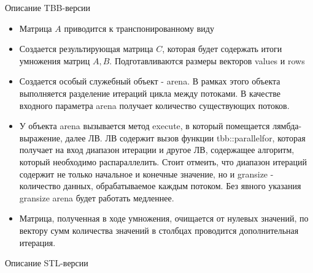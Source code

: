 \documentclass[12pt]{article}
\begin{document}
\begin{center}
\Large{Описание TBB-версии}
\end{center}

\begin{itemize}
    \item Матрица $A$ приводится к транспонированному виду
    \item Создается результирующая матрица $C$, которая будет содержать итоги умножения матриц $A, B$. Подготавливаются размеры векторов values и rows 
    \item Создается особый служебный объект - arena. В рамках этого объекта выполняется разделение итераций цикла между потоками. В качестве входного параметра arena получает количество существующих потоков.
    \item У объекта arena вызывается метод execute, в который помещается лямбда-выражение, далее ЛВ. ЛВ содержит вызов функции tbb::parallel\textunderscore for, которая получает на вход диапазон итерации и другое ЛВ, содержащее алгоритм, который необходимо распараллелить. Стоит отмеить, что диапазон итераций содержит не только начальное и конечные значение, но и gransize - количество данных, обрабатываемое каждым потоком. Без явного указания gransize arena будет работать медленнее. 
        \item Матрица, полученная в ходе умножения, очищается от нулевых значений, по вектору сумм количества значений в столбцах проводится дополнительная итерация.
\end{itemize}
\newpage
\begin{center}
\Large{Описание STL-версии}
\end{center}
\end{document}
